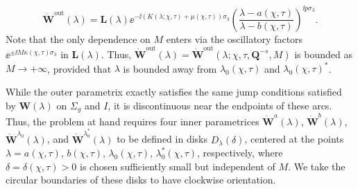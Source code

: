 \begin{equation}
\dot{\mathbf{W}}^\mathrm{out}(\lambda) = \mathbf{L}(\lambda) \ee^{-\ii ( K(\lambda;\chi,\tau) + \mu(\chi,\tau) )\sigma_3}\left(\frac{\lambda-a(\chi,\tau)}{\lambda-b(\chi,\tau)}\right)^{\ii p\sigma_3}.
\label{eq:W-out-full}
\end{equation}
Note that the only dependence on $M$ enters via the oscillatory factors $\ee^{\pm \ii M \kappa(\chi,\tau)\sigma_3}$ in $\mathbf{L}(\lambda)$. Thus, $\dot{\mathbf{W}}^{\text{out}}(\lambda)=\dot{\mathbf{W}}^{\text{out}}(\lambda;\chi,\tau,\mathbf{Q}^{-s},M)$ is bounded as $M\to+\infty$, provided that $\lambda$ is bounded away from $\lambda_0(\chi,\tau)$ and $\lambda_0(\chi,\tau)^*$.


While the outer parametrix exactly satisfies the same jump conditions satisfied by $\mathbf{W}(\lambda)$ on $\Sigma_g$ and $I$, it is discontinuous near the endpoints of these arcs. Thus, the problem at hand
requires four inner parametrices $\dot{\mathbf{W}}^a(\lambda)$, $\dot{\mathbf{W}}^b(\lambda)$, $\dot{\mathbf{W}}^{\lambda_0}(\lambda)$, and $\dot{\mathbf{W}}^{\lambda_0^*}(\lambda)$ to be defined in disks $D_{\lambda}(\delta)$, centered at the points $\lambda=a(\chi,\tau)$, $b(\chi,\tau)$, $\lambda_0(\chi,\tau)$, $\lambda_0^*(\chi,\tau)$, respectively, where $\delta=\delta(\chi,\tau)>0$ is chosen sufficiently small but independent of $M$. We take the circular boundaries of these disks to have clockwise orientation.

